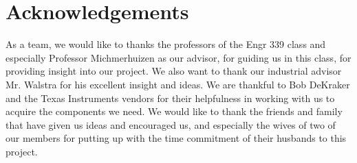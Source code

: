 \documentclass[ppfs.tex]{template/subfiles}
\begin{document}
\section{Acknowledgements}

As a team, we would like to thanks the professors of the Engr 339 class and especially Professor Michmerhuizen as our advisor, for guiding us in this class, for providing insight into our project. We also want to thank our industrial advisor Mr. Walstra for his excellent insight and ideas.
We are thankful to Bob DeKraker and the Texas Instruments vendors for their helpfulness in working with us to acquire the components we need.
We would like to thank the friends and family that have given us ideas and encouraged us, and especially the wives of two of our members for putting up with the time commitment of their husbands to this project.
\end{document}

